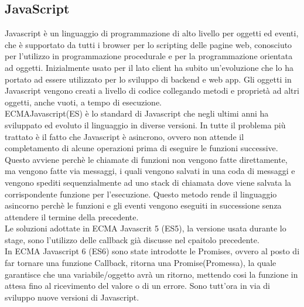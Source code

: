 \subsection{JavaScript}
Javascript \`e un linguaggio di programmazione di alto livello per oggetti ed eventi, che \`e supportato da tutti i browser
per lo scripting delle pagine web, conosciuto per l'utilizzo in programmazione procedurale e per la programmazione orientata ad oggetti.
Inizialmente usato per il lato client ha subito un'evoluzione che lo ha portato ad essere utilizzato per lo sviluppo di backend e web app.
Gli oggetti in Javascript vengono creati a livello di codice collegando metodi e propriet\`a ad altri oggetti, anche vuoti, a tempo
di esecuzione.
\\[2\baselineskip]
ECMAJavascript(ES) \`e lo standard di Javascript che negli ultimi anni ha sviluppato ed evoluto il linguaggio in diverse versioni.
In tutte il problema pi\`u trattato \`e il fatto che Javascript \`e asincrono, ovvero non attende il completamento di alcune
operazioni prima di eseguire le funzioni successive. Questo avviene perch\`e le chiamate di funzioni non vengono fatte direttamente, ma vengono
fatte via messaggi, i quali vengono salvati in una coda di messaggi e vengono spediti sequenzialmente ad uno stack di chiamata dove
viene salvata la corrispondente funzione per l'esecuzione. Questo metodo rende il linguaggio asincorno perch\`e le funzioni e gli eventi
vengono eseguiti in successione senza attendere il termine della precedente.
\\[1\baselineskip]Le soluzioni adottate in ECMA Javascrit 5 (ES5), la versione usata durante lo
stage, sono l'utilizzo delle callback già discusse nel cpaitolo precedente.
\\[1\baselineskip]
In ECMA Javascript 6 (ES6) sono state introdotte le Promises, ovvero al posto di far tornare una funzione Callback, ritorna una Promise(Promessa),
la quale garantisce che una variabile/oggetto avr\`a un ritorno, mettendo cosi la funzione in attesa fino al ricevimento del valore o di un errore.
Sono tutt'ora in via di sviluppo nuove versioni di Javascript.


